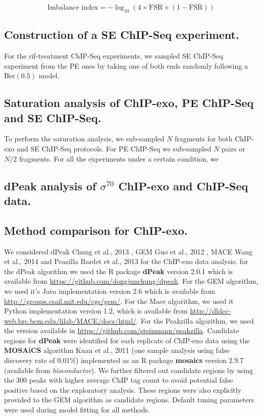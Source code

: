 \documentclass{bmcart}\usepackage[]{graphicx}\usepackage[]{color}
\newcommand{\sig}{\sigma^{70}}
\begin{document}
\[
\mbox{Imbalance index} = -\log_{10} (4 \times \mbox{FSR} \times (1 - \mbox{FSR}))
\]

\subsection*{Construction of a SE ChIP-Seq experiment.}

For the rif-treatment ChIP-Seq experiments, we sampled SE ChIP-Seq
experiment from the PE ones by taking one of both ends randomly
following a $\mbox{Ber}(0.5)$ model. 

\subsection*{Saturation analysis of ChIP-exo, PE ChIP-Seq and SE ChIP-Seq.}

To perform the saturation analysis, we sub-sampled $N$ fragments for
both ChIP-exo and SE ChIP-Seq protocols. For PE ChIP-Seq we
sub-sampled $N$ pairs or $N/2$ fragments. For all the experiments under a certain condition, we 

\subsection*{dPeak analysis of $\sig$ ChIP-exo and ChIP-Seq data.}

\vspace{2 cm}



\subsection*{Method comparison for ChIP-exo.}

We considered dPeak Chung et al., 2013 \cite{dpeak}, GEM Guo et al.,
2012 \cite{gem}, MACE Wang et al., 2014 \cite{mace} and Peazilla
Bardet et al., 2013 \cite{peakzilla} for the ChIP-exo data
analysis. for the dPeak algorithm we used the R package \textbf{dPeak}
version 2.0.1 which is available from
\url{https://github.com/dongjunchung/dpeak}. For the GEM algorithm, we
used it's Java implementation version 2.6 which is available from
\url{http://groups.csail.mit.edu/cgs/gem/}. For the Mace algorithm, we
used it Python implementation version 1.2, which is available from
\url{http://dldcc-web.brc.bcm.edu/lilab/MACE/docs/html/}. For the
Peakzilla algorithm, we used the version available in
\url{https://github.com/steinmann/peakzilla}. Candidate regions for
\textbf{dPeak} were identified for each replicate of ChIP-exo data
using the \textbf{MOSAiCS} algorithm Kuan et al., 2011 \cite{mosaics}
(one sample analysis using false discovery rate of 0.01\%)
implemented as an R package \textbf{mosaics} version 2.9.7 (available
from \emph{bioconductor}). We further filtered out candidate regions
by using the 300 peaks with higher average ChIP tag count to
avoid potential false positive based on the exploratory
analysis. These regions were also explicitly provided to the GEM
algorithm as candidate regions. Default tuning parameters were used
during model fitting for all methods. 
\end{document}
